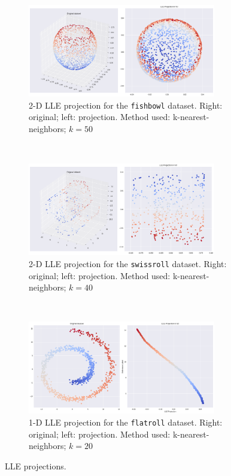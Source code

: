 \documentclass[a4paper,11pt]{article}
\begin{document}
\begin{figure}
	\centering
	\begin{subfigure}[b]{\textwidth}
		\includegraphics[width=0.9\textwidth]{images/assignment7-1.png}
		\caption{2-D LLE projection for the \texttt{fishbowl} dataset.
				 Right: original; left: projection.
				 Method used: k-nearest-neighbors; $k=50$}
		\label{fig:assignment7-1}
	\end{subfigure}
	\\
	\begin{subfigure}[b]{\textwidth}
		\includegraphics[width=0.9\textwidth]{images/assignment7-2.png}
		\caption{2-D LLE projection for the \texttt{swissroll} dataset.
				 Right: original; left: projection.
				 Method used: k-nearest-neighbors; $k=40$}
		\label{fig:assignment7-2}
	\end{subfigure}
	\\
	\begin{subfigure}[b]{\textwidth}
		\includegraphics[width=0.9\textwidth]{images/assignment7-3.png}
		\caption{1-D LLE projection for the \texttt{flatroll} dataset.
				 Right: original; left: projection.
				 Method used: k-nearest-neighbors; $k=20$}
		\label{fig:assignment7-3}
	\end{subfigure}
	\caption{LLE projections.}
	\label{fig:assignment7}
\end{figure}
\end{document}
